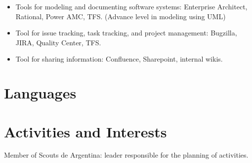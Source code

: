 \documentclass[11pt,a4paper,sans]{moderncv}
\begin{document}
\begin{itemize}
  \item Tools for modeling and documenting software systems: Enterprise Architect, Rational, Power AMC, TFS. (Advance level in modeling using UML)
  \item Tool for issue tracking, task tracking, and project management: Bugzilla, JIRA, Quality Center, TFS.
  \item Tool for sharing information: Confluence, Sharepoint, internal wikis.

\end{itemize}

\section{Languages}


\section{Activities and Interests}

Member of Scouts de Argentina: leader responsible for the planning of activities.
\end{document}
